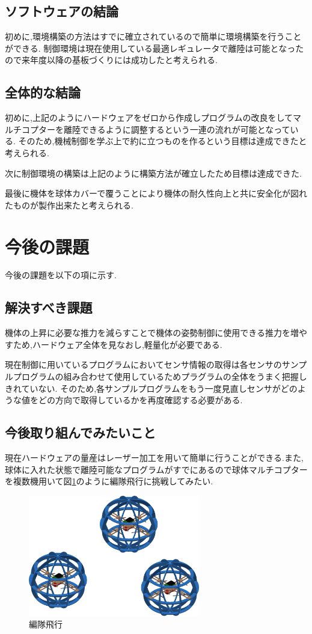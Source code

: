\documentclass[12pt,oneside]{sotsuken_paper}
\begin{document}
\subsection{ソフトウェアの結論}
初めに,環境構築の方法はすでに確立されているので簡単に環境構築を行うことができる.
制御環境は現在使用している最適レギュレータで離陸は可能となったので来年度以降の基板づくりには成功したと考えられる.

\subsection{全体的な結論}
初めに,上記のようにハードウェアをゼロから作成しプログラムの改良をしてマルチコプターを離陸できるように調整するという一連の流れが可能となっている.
そのため,機械制御を学ぶ上で約に立つものを作るという目標は達成できたと考えられる.


次に制御環境の構築は上記のように構築方法が確立したため目標は達成できた.


最後に機体を球体カバーで覆うことにより機体の耐久性向上と共に安全化が図れたものが製作出来たと考えられる.

\section{今後の課題}
今後の課題を以下の項に示す.
\subsection{解決すべき課題}
機体の上昇に必要な推力を減らすことで機体の姿勢制御に使用できる推力を増やすため,ハードウェア全体を見なおし,軽量化が必要である.


現在制御に用いているプログラムにおいてセンサ情報の取得は各センサのサンプルプログラムの組み合わせて使用しているためプラグラムの全体をうまく把握しきれていない.
そのため,各サンプルプログラムをもう一度見直しセンサがどのような値をどの方向で取得しているかを再度確認する必要がある.
\subsection{今後取り組んでみたいこと}
現在ハードウェアの量産はレーザー加工を用いて簡単に行うことができる.また,球体に入れた状態で離陸可能なプログラムがすでにあるので球体マルチコプターを複数機用いて図\ref{fig:hen}のように編隊飛行に挑戦してみたい.

\begin{figure}[htbp]
	\begin{center}
		\includegraphics[width=75mm]{image/hen.png}
		\caption{編隊飛行}
		\label{fig:hen}
	\end{center}
\end{figure}
\end{document}

